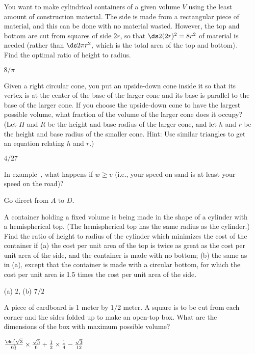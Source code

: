 \begin{exercises}
\exercise
You want to make cylindrical containers of a given volume $V$ using the
least amount of construction material.  The side is made from a
rectangular piece of material, and this can be done with no material
wasted.  However, the top and bottom are cut from squares of side $2r$, so
that $\ds 2(2r)^2=8r^2$ of material is needed (rather than $\ds 2\pi r^2$, which is
the total area of the top and bottom).  Find the optimal ratio of height to
radius.
\begin{answer} $8/\pi$
\end{answer}

\exercise
Given a right circular cone, you put an upside-down cone inside it so that
its vertex is at the center of the base of the larger cone and its base is
parallel to the base of the larger cone.  If you choose the upside-down
cone to have the largest possible volume, what fraction of the volume of
the larger cone does it occupy?  (Let $H$ and $R$ be the height and base
radius of the larger cone, and let $h$ and $r$ be the height and base
radius of the smaller cone.  Hint: Use similar triangles to get an equation
relating $h$ and $r$.)
\begin{answer} $4/27$
\end{answer}

\exercise
In example~, what happens if
$w\ge v$ (i.e., your speed on sand is at least your speed on the
road)?
\begin{answer} Go direct from $A$ to $D$.
\end{answer}

\exercise
A container holding a fixed volume is being made in the shape of a cylinder
with a hemispherical top.  (The hemispherical top has the same radius
as the cylinder.)  Find the ratio of height to radius of the cylinder which
minimizes the cost of the container if (a) the cost per unit area of the
top is twice as great as the cost per unit area of the side, and the
container is made with no bottom; (b) the same as in (a), except that the
container is made with a circular bottom, for which the cost per unit area is
1.5 times the cost per unit area of the side.
\begin{answer} (a) 2, (b) $7/2$
\end{answer}

\exercise A piece of cardboard is 1 meter by $1/2$ meter. A square is
to be cut from each corner and the sides folded up to make an open-top
box. What are the dimensions of the box with maximum possible volume?
\begin{answer} $\ds{\sqrt3\over6}\times{\sqrt3\over6}+{1\over2}\times
{1\over4}-{\sqrt3\over 12}$
\end{answer}



\end{exercises}
